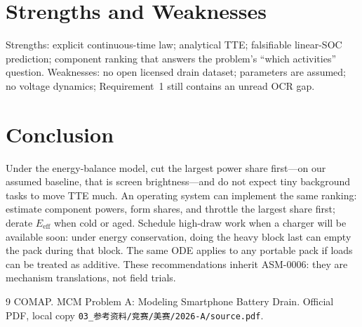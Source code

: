 \documentclass[11pt,letterpaper]{article}
\begin{document}
\section{Strengths and Weaknesses}
Strengths: explicit continuous-time law; analytical TTE; falsifiable linear-SOC prediction;
component ranking that answers the problem's ``which activities'' question.
Weaknesses: no open licensed drain dataset; parameters are assumed; no voltage dynamics;
Requirement~1 still contains an unread OCR gap.

\section{Conclusion}
Under the energy-balance model, cut the largest power share first---on our assumed baseline,
that is screen brightness---and do not expect tiny background tasks to move TTE much.
An operating system can implement the same ranking: estimate component powers, form shares,
and throttle the largest share first; derate \(E_{\mathrm{eff}}\) when cold or aged.
Schedule high-draw work when a charger will be available soon: under energy conservation,
doing the heavy block last can empty the pack during that block.
The same ODE applies to any portable pack if loads can be treated as additive.
These recommendations inherit ASM-0006: they are mechanism translations, not field trials.

\begin{thebibliography}{9}
COMAP.
 MCM Problem A: Modeling Smartphone Battery Drain.
\newblock Official PDF, local copy \texttt{03\_参考资料/竞赛/美赛/2026-A/source.pdf}.
\end{thebibliography}
\end{document}
